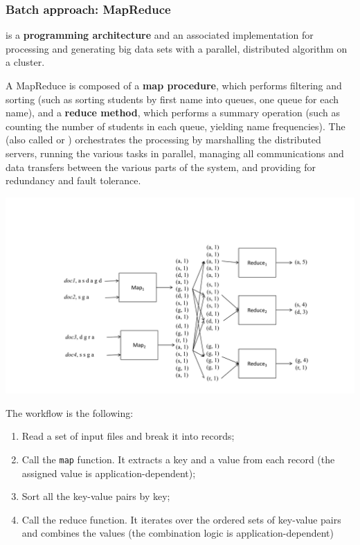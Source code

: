 \subsubsection{Batch approach: MapReduce}

 is a \textbf{programming architecture} and an associated implementation for processing and generating big data sets with a parallel, distributed algorithm on a cluster.

\highspace
A MapReduce is composed of a \textbf{map procedure}, which performs filtering and sorting (such as sorting students by first name into queues, one queue for each name), and a \textbf{reduce method}, which performs a summary operation (such as counting the number of students in each queue, yielding name frequencies). The  (also called  or ) orchestrates the processing by marshalling the distributed servers, running the various tasks in parallel, managing all communications and data transfers between the various parts of the system, and providing for redundancy and fault tolerance.

\begin{examplebox}
    \begin{center}
        \includegraphics[width=\textwidth]{img/mapreduce-1.pdf}
    \end{center}
    The workflow is the following:
    \begin{enumerate}
        \item Read a set of input files and break it into records;
        
        \item Call the \texttt{map} function. It extracts a key and a value from each record (the assigned value is application-dependent);

        \item Sort all the key-value pairs by key;
        
        \item Call the reduce function. It iterates over the ordered sets of key-value pairs and combines the values (the combination logic is application-dependent)
    \end{enumerate}
\end{examplebox}

